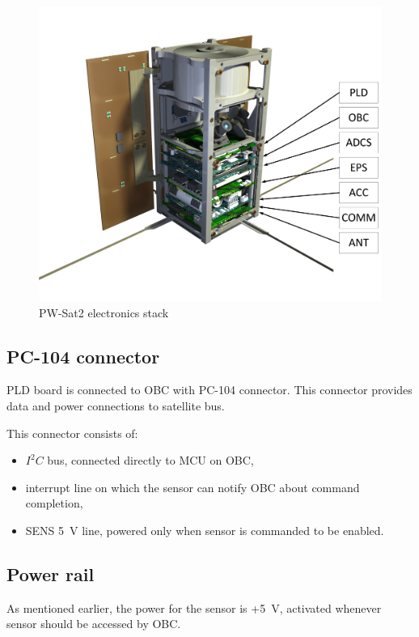         \begin{figure}[H]
            \centering
            \includegraphics[width=0.7\paperwidth]{img/04/PW-Sat2-stack.png}
            \caption{PW-Sat2 electronics stack}
            \label{PW-Sat2_stack}
        \end{figure}

    \subsection{PC-104 connector}
        PLD board is connected to OBC with PC-104 connector. This connector provides data and power connections to satellite bus.

        This connector consists of:
        \begin{itemize}
            \item $I^2C$ bus, connected directly to MCU on OBC,
            \item interrupt line on which the sensor can notify OBC about command completion,
            \item SENS \SI{5}{\volt} line, powered only when sensor is commanded to be enabled.
        \end{itemize}

    \subsection{Power rail}
        As mentioned earlier, the power for the sensor is +\SI{5}{\volt}, activated whenever sensor should be accessed by OBC.

